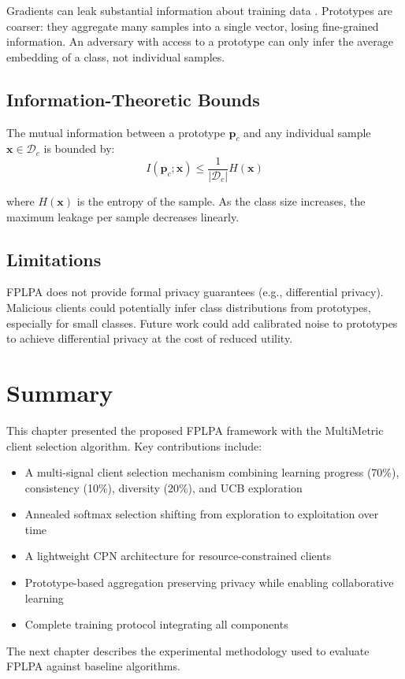 Gradients can leak substantial information about training data \citep{zhu2019deep}. Prototypes are coarser: they aggregate many samples into a single vector, losing fine-grained information. An adversary with access to a prototype can only infer the average embedding of a class, not individual samples.

\subsection{Information-Theoretic Bounds}

The mutual information between a prototype \(\mathbf{p}_c\) and any individual sample \(\mathbf{x} \in \mathcal{D}_c\) is bounded by:
\[
I(\mathbf{p}_c; \mathbf{x}) \leq \frac{1}{|\mathcal{D}_c|} H(\mathbf{x})
\]

where \(H(\mathbf{x})\) is the entropy of the sample. As the class size increases, the maximum leakage per sample decreases linearly.

\subsection{Limitations}

FPLPA does not provide formal privacy guarantees (e.g., differential privacy). Malicious clients could potentially infer class distributions from prototypes, especially for small classes. Future work could add calibrated noise to prototypes to achieve differential privacy at the cost of reduced utility.

\section{Summary}

This chapter presented the proposed FPLPA framework with the MultiMetric client selection algorithm. Key contributions include:

\begin{itemize}
    \item A multi-signal client selection mechanism combining learning progress (70\%), consistency (10\%), diversity (20\%), and UCB exploration
    \item Annealed softmax selection shifting from exploration to exploitation over time
    \item A lightweight CPN architecture for resource-constrained clients
    \item Prototype-based aggregation preserving privacy while enabling collaborative learning
    \item Complete training protocol integrating all components
\end{itemize}

The next chapter describes the experimental methodology used to evaluate FPLPA against baseline algorithms.